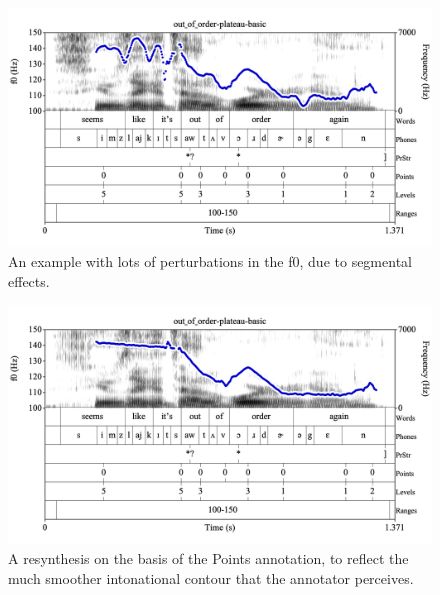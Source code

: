\documentclass[11pt, twoside]{memoir}
\begin{document}
{{{\begin{figure}[H]
\centering
\includegraphics[width=.875\linewidth]{Appendix-out_of_order-plateau}
\caption{An example with lots of perturbations in the f0, due to segmental effects.
\label{fig:out of order-plateau f0-tracking}
}
\end{figure}
\begin{figure}[H]
\centering
\includegraphics[width=.875\linewidth]{Appendix-out_of_order-plateau-resynth}
\caption{A resynthesis on the basis of the Points annotation, to reflect the much smoother intonational contour that the annotator perceives.
\label{fig:out of order-plateau f0-tracking}
}
\end{figure}
}}}
\end{document}
